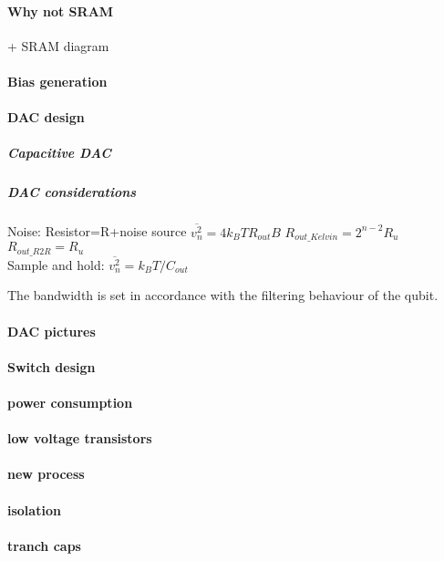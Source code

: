 \documentclass[a4paper,12pt]{article} %
\begin{document}
\paragraph{Why not SRAM} + SRAM diagram
\paragraph{Bias generation}

\paragraph{DAC design}
\subparagraph{Capacitive DAC}
\subparagraph{DAC considerations} Noise: Resistor=R+noise source  $ \overline{v_n^2} = 4k_BTR_{out}B  $ \hspace{2mm}
$R_{out\_Kelvin}=2^{n-2}R_u$ \\
$R_{out\_R2R}=R_u$ \\
Sample and hold: $\overline{v_n^2} = k_BT/C_{out}$


The bandwidth is set in accordance with the filtering behaviour of the qubit.


\paragraph{DAC pictures}


\paragraph{Switch design}

\paragraph{power consumption}

\paragraph{low voltage transistors}

\paragraph{new process}

\paragraph{isolation}

\paragraph{tranch caps}
\end{document}
